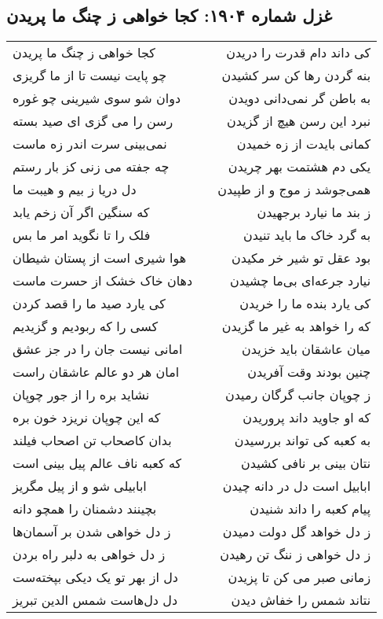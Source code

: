 \begin{center}
\section*{غزل شماره ۱۹۰۴: کجا خواهی ز چنگ ما پریدن}
\label{sec:1904}
\begin{longtable}{l p{0.5cm} r}
کجا خواهی ز چنگ ما پریدن
&&
کی داند دام قدرت را دریدن
\\
چو پایت نیست تا از ما گریزی
&&
بنه گردن رها کن سر کشیدن
\\
دوان شو سوی شیرینی چو غوره
&&
به باطن گر نمی‌دانی دویدن
\\
رسن را می گزی ای صید بسته
&&
نبرد این رسن هیچ از گزیدن
\\
نمی‌بینی سرت اندر زه ماست
&&
کمانی بایدت از زه خمیدن
\\
چه جفته می زنی کز بار رستم
&&
یکی دم هشتمت بهر چریدن
\\
دل دریا ز بیم و هیبت ما
&&
همی‌جوشد ز موج و از طپیدن
\\
که سنگین اگر آن زخم یابد
&&
ز بند ما نیارد برجهیدن
\\
فلک را تا نگوید امر ما بس
&&
به گرد خاک ما باید تنیدن
\\
هوا شیری است از پستان شیطان
&&
بود عقل تو شیر خر مکیدن
\\
دهان خاک خشک از حسرت ماست
&&
نیارد جرعه‌ای بی‌ما چشیدن
\\
کی یارد صید ما را قصد کردن
&&
کی یارد بنده ما را خریدن
\\
کسی را که ربودیم و گزیدیم
&&
که را خواهد به غیر ما گزیدن
\\
امانی نیست جان را در جز عشق
&&
میان عاشقان باید خزیدن
\\
امان هر دو عالم عاشقان راست
&&
چنین بودند وقت آفریدن
\\
نشاید بره را از جور چوپان
&&
ز چوپان جانب گرگان رمیدن
\\
که این چوپان نریزد خون بره
&&
که او جاوید داند پروریدن
\\
بدان کاصحاب تن اصحاب فیلند
&&
به کعبه کی تواند بررسیدن
\\
که کعبه ناف عالم پیل بینی است
&&
نتان بینی بر نافی کشیدن
\\
ابابیلی شو و از پیل مگریز
&&
ابابیل است دل در دانه چیدن
\\
بچینند دشمنان را همچو دانه
&&
پیام کعبه را داند شنیدن
\\
ز دل خواهی شدن بر آسمان‌ها
&&
ز دل خواهد گل دولت دمیدن
\\
ز دل خواهی به دلبر راه بردن
&&
ز دل خواهی ز ننگ تن رهیدن
\\
دل از بهر تو یک دیکی بپخته‌ست
&&
زمانی صبر می کن تا پزیدن
\\
دل دل‌هاست شمس الدین تبریز
&&
نتاند شمس را خفاش دیدن
\\
\end{longtable}
\end{center}
